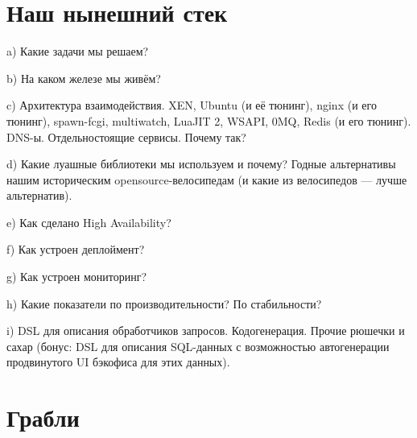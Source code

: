 \documentclass[aspectratio=169,handout]{beamer}
\begin{document}

\section{Наш нынешний стек}

\begin{frame}
a) Какие задачи мы решаем?
\end{frame}

\begin{frame}
b) На каком железе мы живём?
\end{frame}

\begin{frame}
c) Архитектура взаимодействия. XEN, Ubuntu (и её тюнинг), nginx (и его тюнинг), spawn-fcgi, multiwatch, LuaJIT 2, WSAPI, 0MQ, Redis (и его тюнинг). DNS-ы. Отдельностоящие сервисы. Почему так?
\end{frame}

\begin{frame}
d) Какие луашные библиотеки мы используем и почему? Годные альтернативы нашим историческим opensource-велосипедам (и какие из велосипедов — лучше альтернатив).
\end{frame}

\begin{frame}
e) Как сделано High Availability?
\end{frame}

\begin{frame}
f) Как устроен деплоймент?
\end{frame}

\begin{frame}
g) Как устроен мониторинг?
\end{frame}

\begin{frame}
h) Какие показатели по производительности? По стабильности?
\end{frame}

\begin{frame}
i) DSL для описания обработчиков запросов. Кодогенерация. Прочие рюшечки и сахар (бонус: DSL для описания SQL-данных с возможностью автогенерации продвинутого UI бэкофиса для этих данных).
\end{frame}


\section{Грабли}
\end{document}
